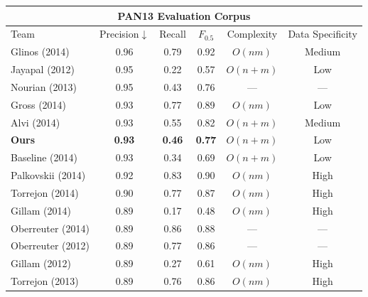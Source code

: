 \begin{table}[th]
\centering
\begin{tabular}{@{}l*{3}{c}cc@{}}
\multicolumn{6}{c}{\bfseries PAN13 Evaluation Corpus} \\
\toprule
Team                    & Precision$\downarrow$ & Recall        & $F_{0.5}$         & Complexity    & Data Specificity  \\
\midrule
        Glinos (2014)   &       0.96            &    0.79       &  0.92             & $O(nm)$       & Medium            \\
       Jayapal (2012)   &       0.95            &    0.22       &  0.57             & $O(n+m)$      & Low               \\
       Nourian (2013)   &       0.95            &    0.43       &  0.76             & ---           & ---               \\
         Gross (2014)   &       0.93            &    0.77       &  0.89             & $O(nm)$       & Low               \\
         Alvi (2014)    &       0.93            &    0.55       &  0.82             & $O(n+m)$      & Medium            \\
        \textbf{Ours}   &\textbf{0.93}          &\textbf{0.46}  &  \textbf{0.77}    & $O(n+m)$      & Low               \\
      Baseline (2014)   &       0.93            &    0.34       &  0.69             & $O(n+m)$      & Low               \\
    Palkovskii (2014)   &       0.92            &    0.83       &  0.90             & $O(nm)$       & High              \\
      Torrejon (2014)   &       0.90            &    0.77       &  0.87             & $O(nm)$       & High              \\
        Gillam (2014)   &       0.89            &    0.17       &  0.48             & $O(nm)$       & High              \\ %
    Oberreuter (2014)   &       0.89            &    0.86       &  0.88             & ---           & ---               \\
    Oberreuter (2012)   &       0.89            &    0.77       &  0.86             & ---           & ---               \\ %
        Gillam (2012)   &       0.89            &    0.27       &  0.61             & $O(nm)$       & High              \\ %
      Torrejon (2013)   &       0.89            &    0.76       &  0.86             & $O(nm)$       & High              \\ %

\end{tabular}
\end{table}
